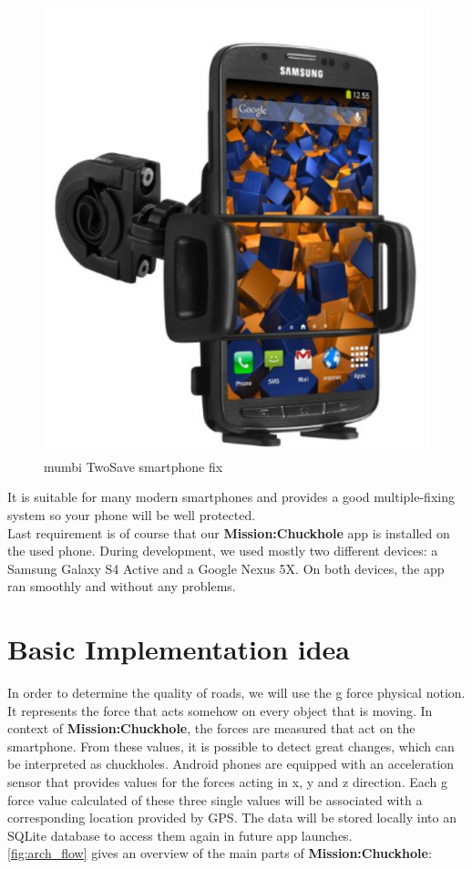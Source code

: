 \documentclass[10pt,a4paper]{article} %
\begin{document}
	\begin{figure}[H]
		\begin{center}
 		  \includegraphics[scale=0.3]{smartphone_fix}
		  \caption{mumbi TwoSave smartphone fix}
		  \label{fig:smartphone_fix}
		\end{center}
	\end{figure}
	\noindent
	It is suitable for many modern smartphones and provides a good multiple-fixing system so your phone will be well protected.\\
	Last requirement is of course that our \textbf{Mission:Chuckhole} app is installed on the used phone.
	During development, we used mostly two different devices: a Samsung Galaxy S4 Active and a Google Nexus 5X.
	On both devices, the app ran smoothly and without any problems.


    \section{Basic Implementation idea}
	
	In order to determine the quality of roads, we will use the g force physical notion. 
	It represents the force that acts somehow on every object that is moving. 
	In context of \textbf{Mission:Chuckhole}, the forces are measured that act on the smartphone.
	From these values, it is possible to detect great changes, which can be interpreted as chuckholes.
	Android phones are equipped with an acceleration sensor that provides values for the forces acting in x, y and z direction.
	Each g force value calculated of these three single values will be associated with a corresponding location provided by GPS.
	The data will be stored locally into an SQLite database to access them again in future app launches.\\
	\autoref{fig:arch_flow} gives an overview of the main parts of \textbf{Mission:Chuckhole}:
	
\end{document}
